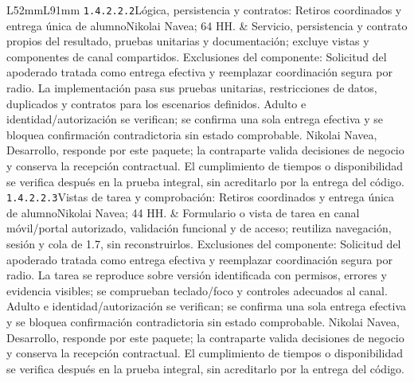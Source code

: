 \begin{longtable}{L{52mm}L{91mm}}
\texttt{1.\allowbreak{}4.\allowbreak{}2.\allowbreak{}2.\allowbreak{}2}\newline Lógica, persistencia y contratos: Retiros coordinados y entrega única de alumno\newline Nikolai Navea; 64 HH. & Servicio, persistencia y contrato propios del resultado, pruebas unitarias y documentación; excluye vistas y componentes de canal compartidos. Exclusiones del componente: Solicitud del apoderado tratada como entrega efectiva y reemplazar coordinación segura por radio. La implementación pasa sus pruebas unitarias, restricciones de datos, duplicados y contratos para los escenarios definidos. Adulto e identidad/autorización se verifican; se confirma una sola entrega efectiva y se bloquea confirmación contradictoria sin estado comprobable. Nikolai Navea, Desarrollo, responde por este paquete; la contraparte valida decisiones de negocio y conserva la recepción contractual. El cumplimiento de tiempos o disponibilidad se verifica después en la prueba integral, sin acreditarlo por la entrega del código.\\\hline
\texttt{1.\allowbreak{}4.\allowbreak{}2.\allowbreak{}2.\allowbreak{}3}\newline Vistas de tarea y comprobación: Retiros coordinados y entrega única de alumno\newline Nikolai Navea; 44 HH. & Formulario o vista de tarea en canal móvil/portal autorizado, validación funcional y de acceso; reutiliza navegación, sesión y cola de 1.7, sin reconstruirlos. Exclusiones del componente: Solicitud del apoderado tratada como entrega efectiva y reemplazar coordinación segura por radio. La tarea se reproduce sobre versión identificada con permisos, errores y evidencia visibles; se comprueban teclado/foco y controles adecuados al canal. Adulto e identidad/autorización se verifican; se confirma una sola entrega efectiva y se bloquea confirmación contradictoria sin estado comprobable. Nikolai Navea, Desarrollo, responde por este paquete; la contraparte valida decisiones de negocio y conserva la recepción contractual. El cumplimiento de tiempos o disponibilidad se verifica después en la prueba integral, sin acreditarlo por la entrega del código.\\\hline

\end{longtable}
